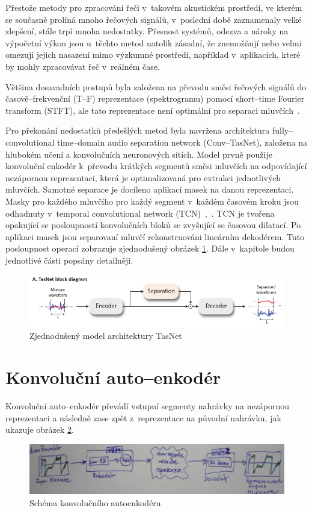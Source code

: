 Přestože metody pro zpracování řeči v~takovém akustickém prostředí, ve kterém se současně prolíná mnoho řečových signálů, v~poslední době zaznamenaly velké zlepšení, stále trpí mnoha nedostatky. Přesnost systémů, odezva a nároky na výpočetní výkon jsou u~těchto metod natolik zásadní, že znemožňují nebo velmi omezují jejich nasazení mimo výzkumné prostředí, například v~aplikacích, které by mohly zpracovávat řeč v~reálném čase.

Většina dosavadních postupů byla založena na převodu směsi řečových signálů do časově--frekvenční (T--F) reprezentace (spektrogramu) pomocí short--time Fourier transform (STFT), ale tato reprezentace není optimální pro separaci mluvčích~\cite{speechseparationoverview}.

Pro překonání nedostatků předešlých metod byla navržena architektura fully--convolutional time--domain audio separation network (Conv--TasNet), založena na hlubokém učení a konvolučních neuronových sítích. Model prvně použije konvoluční enkodér k~převodu krátkých segmentů směsi mluvčích na odpovídající nezápornou reprezentaci, která je optimalizovaná pro extrakci jednotlivých mluvčích. Samotné separace je docíleno aplikací masek na danou reprezentaci. Masky pro každého mluvčího pro každý segment v~každém časovém kroku jsou odhadnuty v~temporal convolutional network (TCN)~\cite{lea2016temporal},~\cite{bai2018empirical}. TCN je tvořena opakující se posloupností konvolučních bloků se zvyšující se časovou dilatací. Po aplikaci masek jsou separovaní mluvčí rekonstruováni lineárním dekodérem. Tuto posloupnost operací zobrazuje zjednodušený obrázek \ref{fig:tasnet-pipe}. Dále v~kapitole budou jednotlivé části popsány detailněji.

\begin{figure}[H]
    \centering
    \includegraphics[scale=0.5]{obrazky-figures/tasnet-pipe.png}
    \caption{\label{fig:tasnet-pipe}Zjednodušený model architektury TasNet}
\end{figure}


\section{Konvoluční auto--enkodér}
Konvoluční auto--enkodér převádí vstupní segmenty nahrávky na nezápornou reprezentaci a následně zase zpět z~reprezentace na původní nahrávku, jak ukazuje obrázek \ref{fig:tasnet-autoenkoder}.
\begin{figure}[H]
    \centering
    \includegraphics[scale=0.5]{obrazky-figures/autoenkoder.png}
    \caption{\label{fig:tasnet-autoenkoder}Schéma konvolučního autoenkodéru}
\end{figure}


